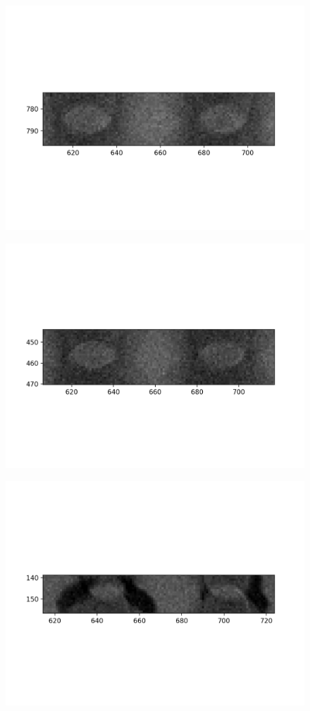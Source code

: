 \documentclass[10pt,a4paper]{article}
\begin{document}
\begin{figure}
	\includegraphics{data/image_stamps/d1}
\end{figure}
\begin{figure}
	\includegraphics{data/image_stamps/d2}
\end{figure}
\begin{figure}
	\includegraphics{data/image_stamps/d3}
\end{figure}
\end{document}
